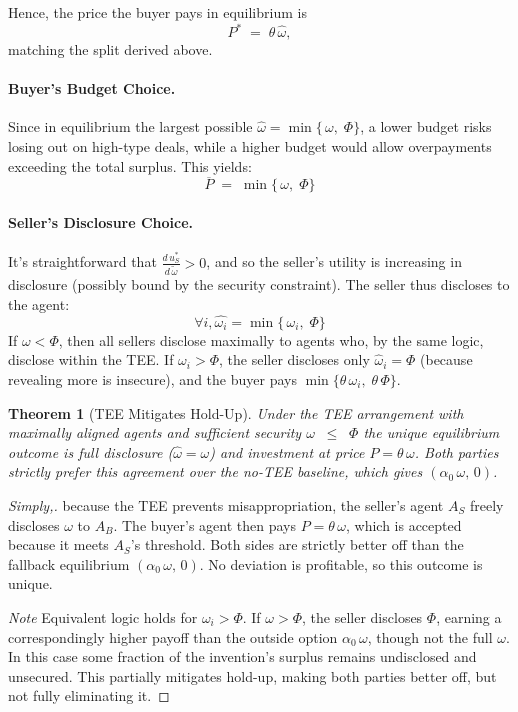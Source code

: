 \documentclass{article}
\newtheorem{theorem}{Theorem}
\begin{document}
Hence, the price the buyer pays in equilibrium is 
\begin{equation}\label{eq:price_equilibrium}
  P^* 
  \;=\; 
  \theta\,\hat{\omega},
\end{equation}
matching the split derived above.

\paragraph{Buyer’s Budget Choice.}
Since in equilibrium the largest possible $\hat{\omega} = \min \{\,\omega,\;\Phi\}$, a lower budget risks losing out on high-type deals, while a higher budget would allow overpayments exceeding the total surplus. This yields:
\[
  \overline{P} \;=\;\min \{\,\omega,\;\Phi\}
\] 

\paragraph{Seller’s Disclosure Choice.}
It's straightforward that $\frac{d\,u_S^*}{d\,\tilde{\omega}} > 0$, and so the seller's utility is increasing in disclosure (possibly bound by the security constraint). The seller thus discloses to the agent:
\[
\forall i, \hat{\omega_i} = \min \{\,\omega_i,\;\Phi\}
\]
If $\omega < \Phi$, then all sellers disclose maximally to agents who, by the same logic, disclose within the TEE. If $\omega_i > \Phi$, the seller discloses only $\hat{\omega}_i = \Phi$
(because revealing more is insecure), and the buyer pays $\min\{\theta\,\omega_i,\;\theta\,\Phi\}$.

\begin{theorem}[TEE Mitigates Hold-Up]
\label{thm:TEE-noError}
Under the TEE arrangement with maximally aligned agents and sufficient security $\omega \;\;\le\;\; \Phi$ the unique equilibrium outcome is \emph{full disclosure} ($\hat{\omega}=\omega$) and \emph{investment} at price $P=\theta\,\omega$.  Both parties strictly prefer this agreement over the no-TEE baseline, which gives $(\alpha_0\,\omega,\,0)$.
\end{theorem}

\begin{proof}[Simply,]
because the TEE prevents misappropriation, the seller’s agent $A_S$ freely discloses
$\omega$ to $A_B$.  The buyer’s agent then pays $P=\theta\,\omega$, which is
accepted because it meets $A_S$’s threshold.  Both sides are strictly better off
than the fallback equilibrium $(\alpha_0\,\omega,\,0)$.  No deviation is profitable,
so this outcome is unique.
\smallskip

\noindent
\emph{Note} Equivalent logic holds for $\omega_i > \Phi$. If \(\omega>\Phi\), the seller discloses \(\Phi\), earning a correspondingly higher payoff than the outside option 
\(\alpha_0\,\omega\), though not the full \(\omega\). In this case some fraction of the invention's surplus remains undisclosed and unsecured. This partially mitigates hold-up, making both parties better off, but not fully eliminating it.
\end{proof}
\end{document}

